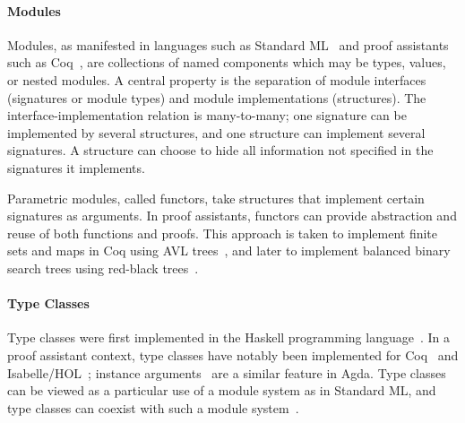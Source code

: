 \paragraph{Modules}
Modules, as manifested in languages such as Standard ML~\citep{MacQueen1986} and proof assistants such as Coq~\citep{Chrzaszcz2003}, are collections of named components which may be types, values, or nested modules. A central property is the separation of module interfaces (signatures or module types) and module implementations (structures). The interface-implementation relation is many-to-many; one signature can be implemented by several structures, and one structure can implement several signatures. A structure can choose to hide all information not specified in the signatures it implements.


Parametric modules, called functors, take structures that implement certain signatures as arguments. In proof assistants, functors can provide abstraction and reuse of both functions and proofs. This approach is taken to implement finite sets and maps in Coq using AVL trees~\citep{Filliatre2004}, and later to implement balanced binary search trees
using red-black trees~\citep{Appel2011b}.

\paragraph{Type Classes}
Type classes were first implemented in the Haskell programming language~\citep{Wadler1989}.
In a proof assistant context, type classes have notably been implemented for Coq~\citep{Sozeau2008} and Isabelle/HOL~\citep{Haftmann2006};
instance arguments~\citep{Devriese2011} are a similar feature in Agda.
Type classes can be viewed as a particular use of a module system as in Standard ML, and type classes can coexist with such a module system~\citep{Dreyer2007}.

